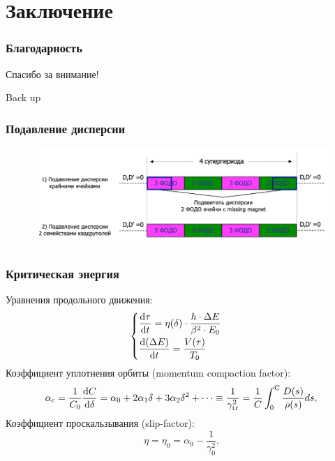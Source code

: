 \section{Заключение}
\begin{frame}
	\frametitle{Благодарность}
	\begin{center}
		Спасибо за внимание!
	\end{center}
	
\end{frame}
\begin{frame}
	\begin{center}
		Back up
	\end{center}
\end{frame}
\begin{frame}
	\frametitle{Подавление дисперсии}
	\begin{figure}
		\centering
		\includegraphics[width=0.8\linewidth]{images/2_disp_supp_shemes}
	\end{figure}
\end{frame}
\begin{frame}
	\frametitle{Критическая энергия}
	Уравнения продольного движения:
	\begin{equation}
		\begin{cases}
			\begin{aligned}
				& \dv{\tau}{t}=\eta(\delta) \cdot \frac{h \cdot \Delta E}{\beta^2 \cdot E_0} \\
				& \dv{(\Delta E)}{t}=\frac{V(\tau)}{T_0}
			\end{aligned}
		\end{cases}
		\label{eq:long_motion_eq_t}
	\end{equation}	
	Коэффициент уплотнения орбиты (momentum compaction factor):
	\begin{equation}
		\alpha_c=\frac{1}{C_0} \dv{C}{\delta}=\alpha_0+2 \alpha_1 \delta+3 \alpha_2 \delta^2+\cdots \equiv \frac{1}{\gamma_{\textrm{tr}}^2} = \frac{1}{C} \int_0^{\mathrm{C}} \frac{D(s)}{\rho(s)} d s,
		\label{eq:alpha}
	\end{equation}
	Коэффициент проскальзывания (slip-factor):
	\begin{equation}
		\eta = \eta_{0} = \alpha_{0} - \frac{1}{\gamma_{0}^2}.
		\label{eq:slip-factor_0}
	\end{equation}
\end{frame}
